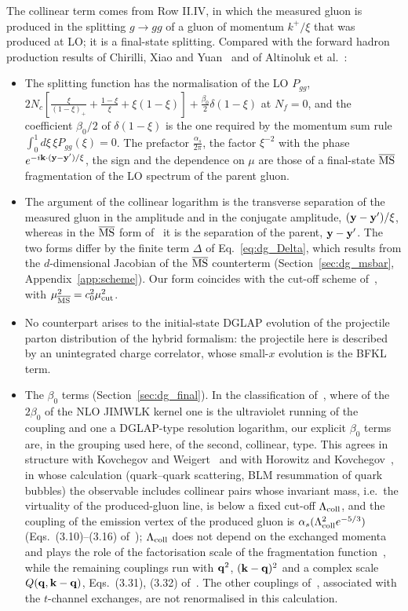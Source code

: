 The collinear term comes from Row II.IV, in which the measured gluon is produced in the splitting $g\to gg$ of a gluon of momentum $k^+/\xi$ that was produced at LO; it is a final-state splitting. Compared with the forward hadron production results of Chirilli, Xiao and Yuan~\cite{Chirilli:2011km,Chirilli:2012jd} and of Altinoluk et al.~\cite{Altinoluk:2014eka}:
\begin{itemize}
\item The splitting function has the normalisation of the LO $P_{gg}$, $2N_c[\frac{\xi}{(1-\xi)_+}+\frac{1-\xi}{\xi}+\xi(1-\xi)]+\frac{\beta_0}{2}\delta(1-\xi)$ at $N_f=0$, and the coefficient $\beta_0/2$ of $\delta(1-\xi)$ is the one required by the momentum sum rule $\int_0^1d\xi\,\xi P_{gg}(\xi)=0$. The prefactor $\frac{\alpha_s}{2\pi}$, the factor $\xi^{-2}$ with the phase $e^{-i\mathbf{k}\cdot(\mathbf{y}-\mathbf{y}')/\xi}$, the sign and the dependence on $\mu$ are those of a final-state $\overline{\rm MS}$ fragmentation of the LO spectrum of the parent gluon.
\item The argument of the collinear logarithm is the transverse separation of the measured gluon in the amplitude and in the conjugate amplitude, $(\mathbf{y}-\mathbf{y}')/\xi$, whereas in the $\overline{\rm MS}$ form of~\cite{Chirilli:2012jd,Altinoluk:2014eka} it is the separation of the parent, $\mathbf{y}-\mathbf{y}'$. The two forms differ by the finite term $\Delta$ of Eq.~\eqref{eq:dg_Delta}, which results from the $d$-dimensional Jacobian of the $\overline{\rm MS}$ counterterm (Section~\ref{sec:dg_msbar}, Appendix~\ref{app:scheme}). Our form coincides with the cut-off scheme of~\cite{Altinoluk:2014eka}, with $\mu^2_{\overline{\rm MS}}=c_0^2\mu^2_{\rm cut}$.
\item No counterpart arises to the initial-state DGLAP evolution of the projectile parton distribution of the hybrid formalism: the projectile here is described by an unintegrated charge correlator, whose small-$x$ evolution is the BFKL term.
\item The $\beta_0$ terms (Section~\ref{sec:dg_final}). In the classification of~\cite{Kovner:2023vsy}, where of the $2\beta_0$ of the NLO JIMWLK kernel one is the ultraviolet running of the coupling and one a DGLAP-type resolution logarithm, our explicit $\beta_0$ terms are, in the grouping used here, of the second, collinear, type. This agrees in structure with Kovchegov and Weigert~\cite{Kovchegov:2007vf} and with Horowitz and Kovchegov~\cite{Horowitz:2010yg}, in whose calculation (quark--quark scattering, BLM resummation of quark bubbles) the observable includes collinear pairs whose invariant mass, i.e.\ the virtuality of the produced-gluon line, is below a fixed cut-off $\Lambda_{\rm coll}$, and the coupling of the emission vertex of the produced gluon is $\alpha_s(\Lambda^2_{\rm coll}e^{-5/3})$ (Eqs.~(3.10)--(3.16) of~\cite{Horowitz:2010yg}); $\Lambda_{\rm coll}$ does not depend on the exchanged momenta and plays the role of the factorisation scale of the fragmentation function~\cite{Kovchegov:2007vf}, while the remaining couplings run with $\mathbf{q}^2$, $(\mathbf{k}-\mathbf{q})^2$ and a complex scale $Q(\mathbf{q},\mathbf{k}-\mathbf{q})$, Eqs.~(3.31), (3.32) of~\cite{Horowitz:2010yg}. The other couplings of~\cite{Horowitz:2010yg}, associated with the $t$-channel exchanges, are not renormalised in this calculation.
\end{itemize}

